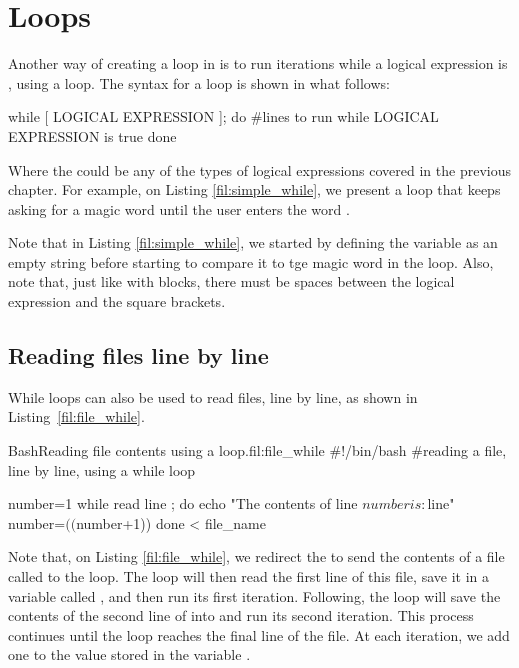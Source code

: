 \section{ Loops}
Another way of creating a loop in  is to run iterations while a logical expression is , using a  loop. The syntax for a  loop is shown in what follows:
\begin{command_line}[Bash]
while [ LOGICAL EXPRESSION ]; do
    #lines to run while LOGICAL EXPRESSION is true
done    
\end{command_line}
Where the  could be any of the types of logical expressions covered in the previous chapter.
For example, on Listing \ref{fil:simple_while}, we present a loop that keeps asking for a magic word until the user enters the word .
Note that in Listing \ref{fil:simple_while},  we started by defining the variable  as an empty string before starting to compare it to tge magic word in the loop. Also, note that, just like with  blocks, there must be spaces between the logical expression and the square brackets.

\subsection{Reading files line by line}
While loops can also be used to read files, line by line, as shown in Listing~\ref{fil:file_while}.

\begin{source_code_float}{Bash}{Reading file contents using a  loop.}{fil:file_while}
#!/bin/bash
#reading a file, line by line, using a while loop

number=1
while read line ; do    
   echo "The contents of line $number is: $line"
   number=$(($number+1))  
done < file_name
\end{source_code_float}
Note that, on Listing \ref{fil:file_while}, we redirect the  to send the contents of a file called  to the  loop. The loop will then read the first line of this file, save it in a variable called , and then run its first iteration. Following, the loop will save the contents of the second line of  into  and run its second iteration. This process continues until the loop reaches the final line of the file. At each iteration, we add one to the value stored in the variable .

